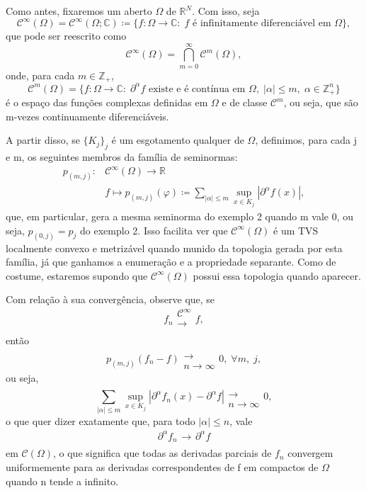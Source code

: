 \documentclass[../distribution_theory_notes.tex]{subfiles}
\begin{document}
\begin{example}
	Como antes, fixaremos um aberto \(\Omega \) de \(\mathbb{R}^{N}\). Com isso, seja
	\[
		\mathcal{C}^{\infty}(\Omega )=\mathcal{C}^{\infty}(\Omega ; \mathbb{C})\coloneqq \{f:\Omega \rightarrow \mathbb{C}:\; f \text{ é infinitamente diferenciável em }\Omega \},
	\]
	que pode ser reescrito como
	\[
		\mathcal{C}^{\infty}(\Omega )=\bigcap_{m=0}^{\infty}\mathcal{C}^{m}(\Omega ),
	\]
	onde, para cada \(m\in \mathbb{Z}_{+}\),
	\[
		\mathcal{C}^{m}(\Omega )=\{f:\Omega \rightarrow \mathbb{C}:\; \partial^{\alpha }f \text{ existe e é contínua em }\Omega,\; |\alpha |\leq m,\; \alpha \in \mathbb{Z}_{+}^{n}\}
	\]
	é o espaço das funções complexas definidas em \(\Omega \) e de classe \(\mathcal{C}^{m}\), ou seja, que são m-vezes continuamente diferenciáveis.

	A partir disso, se \(\{K_{j}\}_{j}\) é um esgotamento qualquer de \(\Omega \), definimos, para cada j e m, os seguintes membros da família de seminormas:
	\begin{align*}
		p_{(m, j)}: & \mathcal{C}^{\infty}(\Omega )\rightarrow \mathbb{R}                                                                \\
		            & f \mapsto p_{(m, j)}(\varphi )\coloneqq \sum\limits_{|\alpha |\leq m}^{}\sup_{x\in K_{j}}|\partial^{\alpha }f(x)|,
	\end{align*}
	que, em particular, gera a mesma seminorma do exemplo 2 quando m vale 0, ou seja, \(p_{(0, j)}=p_{j}\) do exemplo 2. Isso facilita ver que \(\mathcal{C}^{\infty}(\Omega )\) é um TVS localmente convexo e metrizável quando munido da topologia gerada por esta família, já que ganhamos a enumeração e a propriedade separante. Como de costume, estaremos supondo que \(\mathcal{C}^{\infty}(\Omega )\) possui essa topologia quando aparecer.

	Com relação à sua convergência, observe que, se
	\[
		f_{n}\substack{\mathcal{C}^{\infty} \\ \rightarrow \\ }f,
	\]
	então
	\[
		p_{(m, j)}(f_{n}-f)\substack{ \\ \rightarrow \\ n\to \infty}0,\; \forall m,\; j,
	\]
	ou seja,
	\[
		\sum\limits_{|\alpha |\leq m}^{}\sup_{x\in K_{j}}|\partial^{\alpha }f_{n}(x)-\partial^{\alpha }f|\substack{ \\ \rightarrow \\ n\to \infty}0,
	\]
	o que quer dizer exatamente que, para todo \(|\alpha |\leq n\), vale
	\[
		\partial^{\alpha }f_{n}\substack{ \\ \rightarrow \\ }\partial^{\alpha }f
	\]
	em \(\mathcal{C}(\Omega )\), o que significa que todas as derivadas parciais de \(f_{n}\) convergem uniformemente para as derivadas correspondentes de f em compactos de \(\Omega \) quando n tende a infinito.


\end{example}
\end{document}
